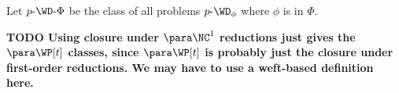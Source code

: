 \documentclass{article}
\newcommand{\todo}[1]{\textbf{TODO #1}}
\newcommand{\dash}{\textnormal{-}}
\newcommand{\cl}[1]{\left[{#1}\right]}
\begin{document}
Let $p \dash \WD \dash \Phi$ be the class of all problems $p \dash \WD_\phi$ where $\phi$ is in $\Phi$.

\todo{
  Using closure under $\para \NC^1$ reductions just gives the $\para \WP[t]$ classes, since $\para \WP[t]$ is probably just the closure under first-order reductions.
  We may have to use a weft-based definition here.
}







\end{document}
